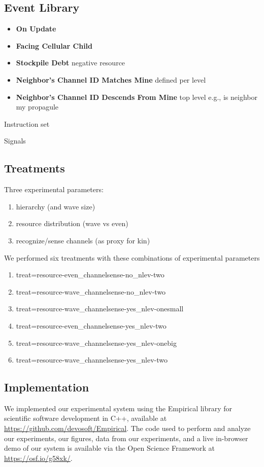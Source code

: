 \subsection{Event Library}

\begin{itemize}
\item \textbf{On Update}
\item \textbf{Facing Cellular Child}
\item \textbf{Stockpile Debt} negative resource
\item \textbf{Neighbor's Channel ID Matches Mine} defined per level
\item \textbf{Neighbor's Channel ID Descends From Mine} top level
e.g., is neighbor my propagule
\end{itemize}

Instruction set

Signals

\subsection{Treatments}

Three experimental parameters:
\begin{enumerate}
\item hierarchy (and wave size)
\item resource distribution (wave vs even)
\item recognize/sense channels (as proxy for kin)
\end{enumerate}

We performed six treatments with these combinations of experimental parameters
\begin{enumerate}
\item treat=resource-even\_channelsense-no\_nlev-two
\item treat=resource-wave\_channelsense-no\_nlev-two
\item treat=resource-wave\_channelsense-yes\_nlev-onesmall
\item treat=resource-even\_channelsense-yes\_nlev-two
\item treat=resource-wave\_channelsense-yes\_nlev-onebig
\item treat=resource-wave\_channelsense-yes\_nlev-two
\end{enumerate}

\subsection{Implementation}

We implemented our experimental system using the Empirical library for scientific software development in C++, available at \url{https://github.com/devosoft/Empirical}.
The code used to perform and analyze our experiments, our figures, data from our experiments, and a live in-browser demo of our system is available via the Open Science Framework at \url{https://osf.io/g58xk/}.
